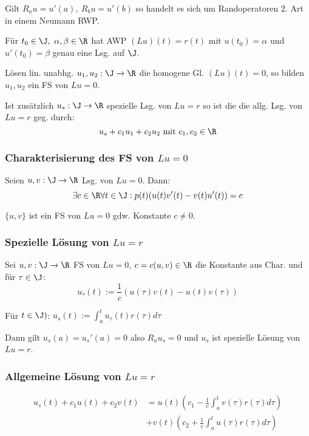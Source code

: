 \spacing

Gilt \(R_a u = u'(a), \ R_b u = u'(b)\) so handelt es sich um Randoperatoren 2. Art in einem Neumann RWP.

\spacing

Für \(t_0 \in \J, \ \alpha,\beta \in \R\) hat AWP \((Lu)(t)=r(t)\) mit \(u(t_0)=\alpha\) und \(u'(t_0)=\beta\) genau eine Lsg. auf \(\J\).

\spacing

Lösen lin. unabhg. \(u_1,u_2 : \J \to \R\) die homogene Gl. \((Lu)(t)=0\), so bilden \(u_1,u_2\) ein FS von \(Lu=0\).

Ist zusätzlich \(u_s : \J \to \R\) spezielle Lsg. von \(Lu=r\) so ist die die allg. Lsg. von \(Lu=r\) geg. durch: \[u_s+c_1 u_1+c_2 u_2 \text{ mit } c_1, c_2 \in \R\]

\subsubsection*{Charakterisierung des FS von \(Lu=0\)}

Seien \(u,v : \J \to \R\) Lsg. von \(Lu=0\). Dann: \[\exists c \in \R \forall t \in \J : p(t)(u(t)v'(t)-v(t)u'(t)) = c\]

\(\{u,v\}\) ist ein FS von \(Lu=0\) gdw. Konstante \(c \neq 0\).

\subsubsection*{Spezielle Lösung von \(Lu=r\)}

Sei \(u,v : \J \to \R\) FS von \(Lu=0\), \(c = c(u,v) \in \R\) die Konstante aus Char. und für \(\tau \in \J\): \[u_\tau(t) := \frac{1}{c} (u(\tau)v(t)-u(t)v(\tau))\]

Für \(t \in \J)\): \(u_s(t) := \displaystyle\int_a^t u_\tau(t) r(\tau) d\tau\)

Dann gilt \(u_s(a) = u_s'(a) = 0\) also \(R_a u_s = 0\) und \(u_s\) ist spezielle Lösung von \(Lu=r\).

\subsubsection*{Allgemeine Lösung von \(Lu=r\)}

\vspace*{-4mm}
\begin{align*}
u_s(t)+c_1 u(t) + c_2 v(t) &= u(t)\left(c_1-\frac{1}{c}\int_a^t v(\tau) r(\tau) d\tau \right) \\
&+ v(t)\left(c_2+\frac{1}{c}\int_a^t u(\tau)r(\tau) d\tau \right)
\end{align*}

